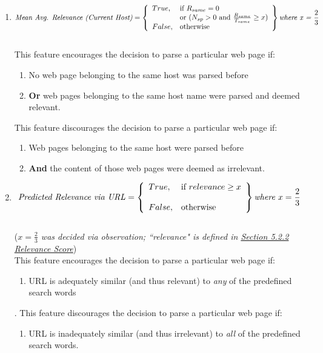 \documentclass{article}
\begin{document}
\begin{enumerate}
	\item %
\[
	\text{\textit{Mean Avg. Relevance (Current Host)}} = \left\{\begin{array}{ll}
		True,	& \text{if }  R_{same} = 0 \\
				& \text{or } (N_{sp} > 0 \text{ and }\frac{R_{same}}{T_{same}} \geq x) \\
		False,	& \text{otherwise}
	\end{array}\right\} \textit{where x = $ \frac{2}{3} $}
\] \\ This feature encourages the decision to parse a particular web page if:
	\begin{enumerate}
		\item No web page belonging to the same host was parsed before
		\item \textbf{Or} web pages belonging to the same host name were parsed and deemed relevant.
	\end{enumerate}
	This feature discourages the decision to parse a particular web page if:
	\begin{enumerate}
		\item Web pages belonging to the same host were parsed before
		\item \textbf{And} the content of those web pages were deemed as irrelevant.
	\end{enumerate}

	\item %
\[
	\text{\textit{Predicted Relevance via URL}} = \left\{\begin{array}{ll}
		True,	& \text{if } relevance \geq x \\ \\
		False,	& \text{otherwise}
	\end{array}\right\} \textit{where $ x = \frac{2}{3} $}
\] \\ (\textit{$ x = \frac{2}{3} $ \textit{ was decided via observation}; ``relevance" is defined in \hyperref[sec:5.2.2]{Section 5.2.2 Relevance Score}}) \\ This feature encourages the decision to parse a particular web page if:
	\begin{enumerate}
		\item URL is adequately similar (and thus relevant) to \textit{any} of the predefined search words
	\end{enumerate}.
	This feature discourages the decision to parse a particular web page if:
	\begin{enumerate}
		\item URL is inadequately similar (and thus irrelevant) to \textit{all} of the predefined search words.
	\end{enumerate}
\end{enumerate}
\newpage
\end{document}
